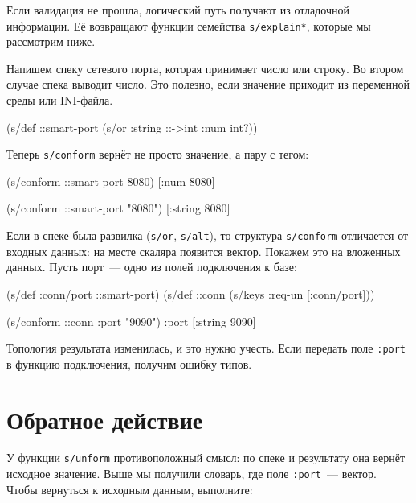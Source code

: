 
Если валидация не прошла, логический путь получают из отладочной информации. Её
возвращают функции семейства \verb|s/explain*|, которые мы рассмотрим ниже.

Напишем спеку сетевого порта, которая принимает число или строку. Во втором
случае спека выводит число. Это полезно, если значение приходит из переменной
среды или INI-файла.

\begin{english}
  \begin{clojure}
(s/def ::smart-port
  (s/or :string ::->int :num int?))
  \end{clojure}
\end{english}

\noindent
Теперь \verb|s/conform| вернёт не просто значение, а пару с тегом:

\begin{english}
  \begin{clojure}
(s/conform ::smart-port 8080)
[:num 8080]

(s/conform ::smart-port "8080")
[:string 8080]
  \end{clojure}
\end{english}


Если в спеке была развилка (\verb|s/or|, \verb|s/alt|), то структура
\verb|s/conform| отличается от входных данных: на месте скаляра появится
вектор. Покажем это на вложенных данных. Пусть порт~--- одно из полей
подключения к базе:

\begin{english}
  \begin{clojure}
(s/def :conn/port ::smart-port)
(s/def ::conn
  (s/keys :req-un [:conn/port]))

(s/conform ::conn {:port "9090"})
{:port [:string 9090]}
  \end{clojure}
\end{english}

Топология результата изменилась, и это нужно учесть. Если передать поле
\verb|:port| в функцию подключения, получим ошибку типов.

\section{Обратное действие}


У функции \verb|s/unform| противоположный смысл: по спеке и результату она
вернёт исходное значение. Выше мы получили словарь, где поле \verb|:port|~---
вектор. Чтобы вернуться к исходным данным, выполните:

